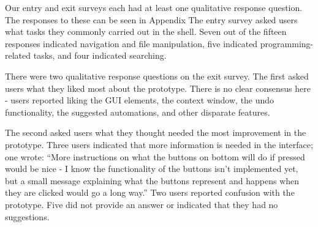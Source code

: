 Our entry and exit surveys each had at least one qualitative response question.
The responses to these can be seen in Appendix
The entry survey asked users what tasks they commonly carried out in the shell.
Seven out of the fifteen responses indicated navigation and file manipulation,
five indicated programming-related tasks, and four indicated searching.

There were two qualitative response questions on the exit survey. The first
asked users what they liked most about the prototype. There is no clear
consensus here \-- users reported liking the GUI elements, the context window, the
undo functionality, the suggested automations, and other disparate features.

The second asked users what they thought needed the most improvement in the
prototype. Three users indicated that more information is needed in the
interface; one wrote: ``More instructions on what the buttons on bottom will do
if pressed would be nice \-- I know the functionality of the buttons isn't
implemented yet, but a small message explaining what the buttons represent and
happens when they are clicked would go a long way.'' Two users reported
confusion with the prototype. Five did not provide an answer or indicated that
they had no suggestions.

